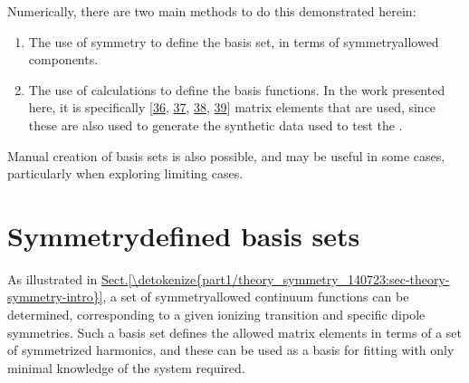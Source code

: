 \documentclass[letterpaper,table,10pt,english]{jupyterBook}
\begin{document}
\sphinxAtStartPar
Numerically, there are two main methods to do this demonstrated herein:
\begin{enumerate}
%
\item {} 
\sphinxAtStartPar
The use of symmetry to define the basis set, in terms of symmetry\sphinxhyphen{}allowed components.

\item {} 
\sphinxAtStartPar
The use of  calculations to define the basis functions. In the work presented here, it is specifically  {[}\hyperlink{cite.backmatter/bibliography:id764}{36}, \hyperlink{cite.backmatter/bibliography:id628}{37}, \hyperlink{cite.backmatter/bibliography:id805}{38}, \hyperlink{cite.backmatter/bibliography:id767}{39}{]} matrix elements that are used, since these are also used to generate the synthetic data used to test the {\hyperref[\detokenize{backmatter/glossary:term-bootstrap-retrieval-protocol}]{}}.

\end{enumerate}

\sphinxAtStartPar
Manual creation of basis sets is also possible, and may be useful in some cases, particularly when exploring limiting cases.


\section{Symmetry\sphinxhyphen{}defined basis sets}
\label{\detokenize{part2/sym-fitting-intro_240723:symmetry-defined-basis-sets}}
\sphinxAtStartPar
As illustrated in \hyperref[\detokenize{part1/theory_symmetry_140723:sec-theory-symmetry-intro}]{Sect.\@ \ref{\detokenize{part1/theory_symmetry_140723:sec-theory-symmetry-intro}}}, a set of symmetry\sphinxhyphen{}allowed continuum functions can be determined, corresponding to a given ionizing transition and specific dipole symmetries. Such a basis set defines the allowed matrix elements in terms of a set of symmetrized harmonics, and these can be used as a basis for fitting with only minimal knowledge of the system required.
\end{document}
